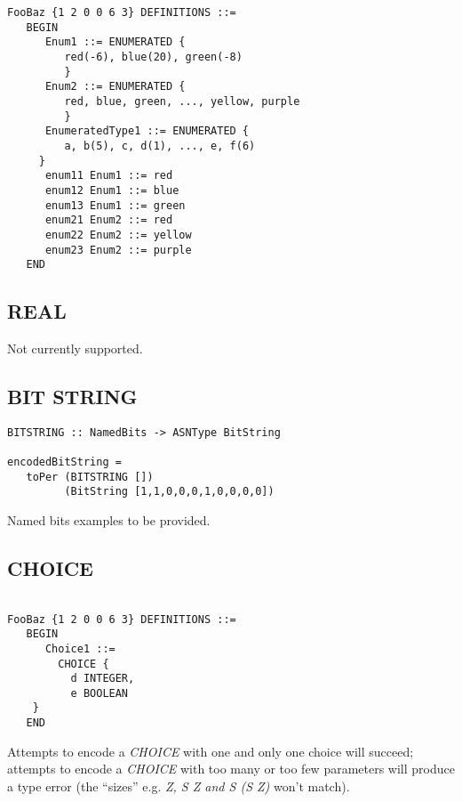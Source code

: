 \documentclass{article}
\begin{document}
\begin{lstlisting}[frame=single]
FooBaz {1 2 0 0 6 3} DEFINITIONS ::=
   BEGIN
      Enum1 ::= ENUMERATED {
         red(-6), blue(20), green(-8)
         }
      Enum2 ::= ENUMERATED {
         red, blue, green, ..., yellow, purple
         }
      EnumeratedType1 ::= ENUMERATED {
         a, b(5), c, d(1), ..., e, f(6)
	 }
      enum11 Enum1 ::= red
      enum12 Enum1 ::= blue
      enum13 Enum1 ::= green
      enum21 Enum2 ::= red
      enum22 Enum2 ::= yellow
      enum23 Enum2 ::= purple
   END
\end{lstlisting}

\subsection{REAL}

Not currently supported.

\subsection{BIT STRING}

\begin{lstlisting}[frame=single]
BITSTRING :: NamedBits -> ASNType BitString

encodedBitString = 
   toPer (BITSTRING []) 
         (BitString [1,1,0,0,0,1,0,0,0,0])
\end{lstlisting}

Named bits examples to be provided.

\subsection{CHOICE}

\begin{lstlisting}[frame=single]

FooBaz {1 2 0 0 6 3} DEFINITIONS ::=
   BEGIN
      Choice1 ::= 
        CHOICE {
          d INTEGER,
          e BOOLEAN
	}
   END
\end{lstlisting}

Attempts to encode a {\em CHOICE} with one and only one choice will 
succeed; attempts to encode a {\em CHOICE} with too many or too few
parameters will produce a type error (the ``sizes'' e.g. {\em Z, S Z and S (S Z)} won't match).
\end{document}

